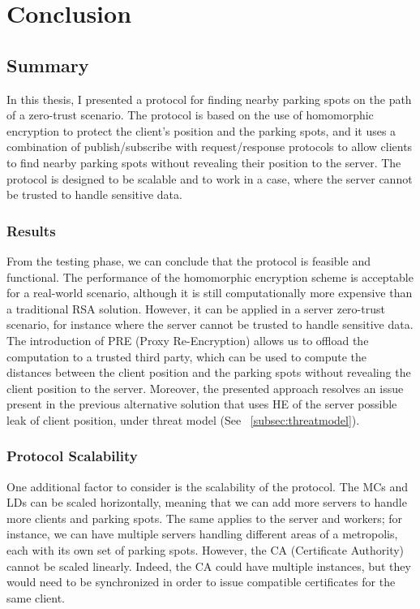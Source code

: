 \chapter{Conclusion} \label{chap:conclusion}

\section{Summary}

In this thesis, I presented a protocol for finding nearby parking spots on the path of a zero-trust scenario. The protocol is based on the use of homomorphic encryption to protect the client's position and the parking spots, and it uses a combination of publish/subscribe with request/response protocols to allow clients to find nearby parking spots without revealing their position to the server. The protocol is designed to be scalable and to work in a case, where the server cannot be trusted to handle sensitive data.

\subsection{Results}

From the testing phase, we can conclude that the protocol is feasible and functional. The performance of the homomorphic encryption scheme is acceptable for a real-world scenario, although it is still computationally more expensive than a traditional RSA solution. However, it can be applied in a server zero-trust scenario, for instance where the server cannot be trusted to handle sensitive data. The introduction of PRE (Proxy Re-Encryption) allows us to offload the computation to a trusted third party, which can be used to compute the distances between the client position and the parking spots without revealing the client position to the server. Moreover, the presented approach resolves an issue present in the previous alternative solution that uses HE of the server possible leak of client position, under threat model (See ~\cref{subsec:threatmodel}).

\subsection{Protocol Scalability}

One additional factor to consider is the scalability of the protocol. The MCs and LDs can be scaled horizontally, meaning that we can add more servers to handle more clients and parking spots. The same applies to the server and workers; for instance, we can have multiple servers handling different areas of a metropolis, each with its own set of parking spots. However, the CA (Certificate Authority) cannot be scaled linearly. Indeed, the CA could have multiple instances, but they would need to be synchronized in order to issue compatible certificates for the same client.

